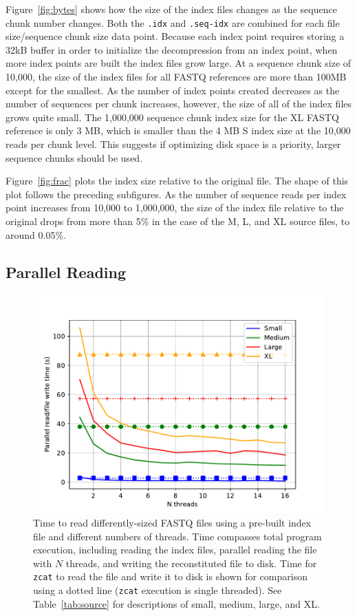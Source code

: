 Figure~\ref{fig:bytes} shows how the size of the index files changes as the
sequence chunk number changes. Both the \texttt{.idx} and \texttt{.seq-idx} are
combined for each file size/sequence chunk size data point. Because each index
point requires storing a 32kB buffer in order to initialize the \zlib
decompression from an index point, when more index points are built the index
files grow large. At a sequence chunk size of 10,000, the size of the index
files for all \gzip FASTQ references are more than 100MB except for the
smallest. As the number of index points created decreases as the number of
sequences per chunk increases, however, the size of all of the index files grows
quite small. The 1,000,000 sequence chunk index size for the XL FASTQ reference
is only 3 MB, which is smaller than the 4 MB S index size at the 10,000 reads
per chunk level. This suggests if optimizing disk space is a priority, larger
sequence chunks should be used.

Figure~\ref{fig:frac} plots the index size relative to the original \gzip file.
The shape of this plot follows the preceding subfigures. As the number of
sequence reads per index point increases from 10,000 to 1,000,000, the size of
the index file relative to the original \gzip drops from more than 5\% in the
case of the M, L, and XL source files, to around 0.05\%.

\subsection{Parallel Reading}
\label{sec:readresults}

\begin{figure}[h]
    \includegraphics[width=\linewidth]{figs/threads.pdf}
    \caption{Time to read differently-sized FASTQ \gzip files using a pre-built
    index file and different numbers of threads. Time compasses total program
    execution, including reading the index files, parallel reading the \gzip
    file with $N$ threads, and writing the reconstituted file to disk. Time for
    \texttt{zcat} to read the file and write it to disk is shown for comparison
    using a dotted line (\texttt{zcat} execution is single threaded). See
    Table~\ref{tab:source} for descriptions of small, medium, large, and XL.}
    \label{fig:threads}
\end{figure}

